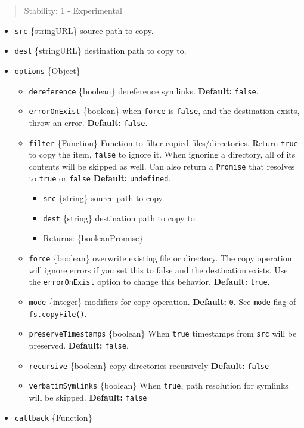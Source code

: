 \begin{quote}
Stability: 1 - Experimental
\end{quote}

\begin{itemize}
\tightlist
\item
  \texttt{src} \{string\textbar URL\} source path to copy.
\item
  \texttt{dest} \{string\textbar URL\} destination path to copy to.
\item
  \texttt{options} \{Object\}

  \begin{itemize}
  \tightlist
  \item
    \texttt{dereference} \{boolean\} dereference symlinks.
    \textbf{Default:} \texttt{false}.
  \item
    \texttt{errorOnExist} \{boolean\} when \texttt{force} is
    \texttt{false}, and the destination exists, throw an error.
    \textbf{Default:} \texttt{false}.
  \item
    \texttt{filter} \{Function\} Function to filter copied
    files/directories. Return \texttt{true} to copy the item,
    \texttt{false} to ignore it. When ignoring a directory, all of its
    contents will be skipped as well. Can also return a \texttt{Promise}
    that resolves to \texttt{true} or \texttt{false} \textbf{Default:}
    \texttt{undefined}.

    \begin{itemize}
    \tightlist
    \item
      \texttt{src} \{string\} source path to copy.
    \item
      \texttt{dest} \{string\} destination path to copy to.
    \item
      Returns: \{boolean\textbar Promise\}
    \end{itemize}
  \item
    \texttt{force} \{boolean\} overwrite existing file or directory. The
    copy operation will ignore errors if you set this to false and the
    destination exists. Use the \texttt{errorOnExist} option to change
    this behavior. \textbf{Default:} \texttt{true}.
  \item
    \texttt{mode} \{integer\} modifiers for copy operation.
    \textbf{Default:} \texttt{0}. See \texttt{mode} flag of
    \hyperref[fscopyfilesrc-dest-mode-callback]{\texttt{fs.copyFile()}}.
  \item
    \texttt{preserveTimestamps} \{boolean\} When \texttt{true}
    timestamps from \texttt{src} will be preserved. \textbf{Default:}
    \texttt{false}.
  \item
    \texttt{recursive} \{boolean\} copy directories recursively
    \textbf{Default:} \texttt{false}
  \item
    \texttt{verbatimSymlinks} \{boolean\} When \texttt{true}, path
    resolution for symlinks will be skipped. \textbf{Default:}
    \texttt{false}
  \end{itemize}
\item
  \texttt{callback} \{Function\}
\end{itemize}

